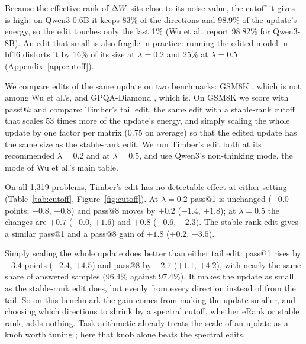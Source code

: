 Because the effective rank of $\Delta W$ sits close to its noise value, the cutoff
it gives is high: on Qwen3-0.6B it keeps 83\% of the directions and 98.9\% of
the update's energy, so the edit touches only the last 1\% (Wu et al.\ report
98.82\% for Qwen3-8B). An edit that small is also fragile in practice: running
the edited model in bf16 distorts it by 16\% of its size at $\lambda=0.2$ and
25\% at $\lambda=0.5$ (Appendix~\ref{app:cutoff}).

We compare edits of the same update on two benchmarks: GSM8K
\citep{cobbe2021gsm8k}, which is not among Wu et al.'s, and GPQA-Diamond
\citep{rein2024gpqa}, which is. On GSM8K we score with pass@$k$
\citep{chen2021codex} and compare:
Timber's tail edit, the same edit with a stable-rank cutoff that scales 53
times more of the update's energy, and simply scaling the whole update by one
factor per matrix (0.75 on average) so that the edited update has the same
size as the stable-rank edit. We run Timber's edit both at its recommended
$\lambda=0.2$ and at $\lambda=0.5$, and use Qwen3's non-thinking mode, the
mode of Wu et al.'s main table.

On all 1{,}319 problems, Timber's edit has no detectable effect at either
setting (Table~\ref{tab:cutoff}, Figure~\ref{fig:cutoff}). At $\lambda=0.2$
pass@1 is unchanged ($-0.0$ points; $-0.8$, $+0.8$) and pass@8 moves by
$+0.2$ ($-1.4$, $+1.8$); at $\lambda=0.5$ the changes are $+0.7$ ($-0.0$,
$+1.6$) and $+0.8$ ($-0.6$, $+2.3$). The stable-rank edit gives a similar
pass@1 and a pass@8 gain of $+1.8$ ($+0.2$, $+3.5$).

Simply scaling the whole update does better than either tail edit: pass@1
rises by $+3.4$ points ($+2.4$, $+4.5$) and pass@8 by $+2.7$ ($+1.1$,
$+4.2$), with nearly the same share of answered samples (96.4\% against
97.4\%). It makes the update as small as the stable-rank edit does, but evenly
from every direction instead of from the tail. So on this benchmark the gain
comes from making the update smaller, and choosing which directions to shrink
by a spectral cutoff, whether eRank or stable rank, adds nothing. Task
arithmetic already treats the scale of an update as a knob worth tuning
\citep{ilharco2023task}; here that knob alone beats the spectral edits.

